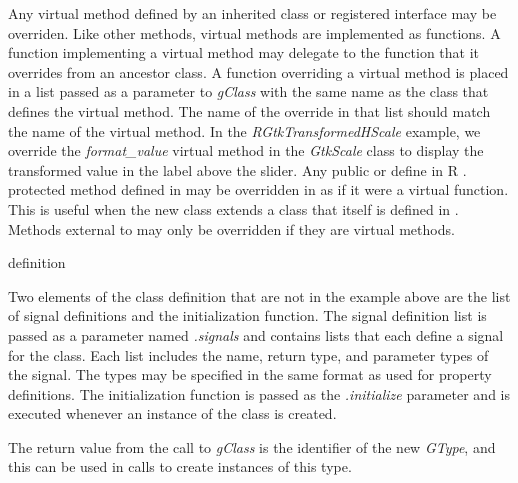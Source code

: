 \documentclass[article]{jss}
\begin{document}
Any virtual method defined by an inherited class or registered
interface may be overriden. Like other methods, virtual methods are implemented as  functions. A function implementing a virtual method may delegate to the function that it overrides from an ancestor class.
A function overriding a virtual method is 
placed in a list passed as a parameter to \emph{gClass} with the same name as the class that defines the virtual 
method. The name of the override in that list should match the name
of the virtual method. In the \emph{RGtkTransformedHScale} example, we override the \emph{format\_value} virtual method
in the \emph{GtkScale} class to display the
transformed value in the label above the slider.  Any public or 
define in R .
protected method defined in  may be overridden in 
 as if it were a virtual function. This is useful when the new class extends a class that itself is defined in . Methods external to  may only be overridden if they are virtual methods.

definition


Two elements of the class definition that are not in the example above
are
the list of signal definitions and the initialization function.
The signal definition list is passed as a parameter named \emph{.signals} and contains lists that each
define a signal for the class. Each list includes the name, return
type, and parameter types of the signal. The types may be specified in the same format as used for property definitions. The initialization
function is passed as the \emph{.initialize} parameter and is executed whenever an instance of the class is created.

The return value from the call to \emph{gClass} is the identifier of the new \emph{GType}, and this can be used in calls to create instances of this type.
\end{document}
